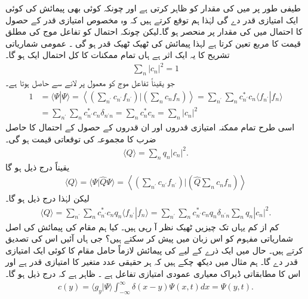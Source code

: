 طیفی طور پر  میں  کی مقدار کو  ظاہر کرتی ہے اور چونکہ کوئی بھی پیمائش  کی کوئی ایک امتیازی قدر دے گی لہٰذا ہم توقع کرتے ہیں کہ وہ مخصوص امتیازی قدر  کے حصول کا احتمال  میں  کی مقدار پر منحصر ہو گا۔لیکن چونکہ احتمال کو تفاعل موج کی مطلق قیمت کا مربع تعین کرتا ہے لہذا پیمائش کی ٹھیک ٹھیک قدر  ہو گی ۔ عمومی شماریاتی تشریح کا یہ ایک اثر ہے ہاں تمام ممکنات کا کل احتمال ایک ہو گا۔
\begin{align}
\sum_{n} |c_{n}|^{2} = 1
\end{align}
جو یقیناً تفاعل موج کو معمول پر لانے سے حاصل ہوتا ہے۔
\begin{align}
1 &= \langle \Psi | \Psi \rangle = \left\langle \left( \sum_{n^{'}}c_{n^{'}}f_{n^{'}}\right) \bigg| \left( \sum_{n} c_{n}f_{n} \right) \right\rangle = \sum_{n^{'}}\sum_{n} c_{n^{'}}^{*}c_{n}\langle f_{n^{'}} | f_{n} \rangle \nonumber \\
&= \sum_{n^{'}}\sum_{n} c_{n^{'}}^{*}c_{n} \delta_{n^{'}n} = \sum_{n}c_{n}^{*}c_{n} = \sum_{n}|c_{n}|^{2}
\end{align}
اسی طرح تمام ممکنہ امتیازی قدروں اور ان قدروں کے حصول کے احتمال کا حاصل ضرب کا مجموعہ کی توقعاتی قیمت ہو گی۔
\begin{align}
\langle Q \rangle = \sum_{n}q_{n}|c_{n}|^{2}.
\end{align}
یقیناً درج ذیل ہو گا 
\begin{align}
\langle Q \rangle = \langle \Psi | \hat{Q} \Psi \rangle =  \left\langle \left( \sum_{n^{'}}c_{n^{'}}f_{n^{'}}\right) \bigg| \left( \hat{Q} \sum_{n} c_{n}f_{n} \right) \right\rangle
\end{align}
لیکن  لہٰذا درج ذیل ہو گا۔
\begin{align}
\langle Q \rangle = \sum_{n^{'}}\sum_{n} c_{n^{'}}^{*}c_{n} q_{n} \langle f_{n^{'}} | f_{n} \rangle = \sum_{n^{'}}\sum_{n} c_{n^{'}}^{*}c_{n} q_{n} \delta_{n^{'}n} \sum_{n}q_{n}|c_{n}|^{2}.
\end{align}
کم از کم یہاں تک چیزیں ٹھیک نظر آ رہی ہیں۔
کیا ہم مقام کی پیمائش کی اصل شماریاتی مفہوم کو اس زبان میں پیش کر سکتے ہیں؟ جی ہاں آئیں اس کی تصدیق کرتے ہیں۔ حال  میں ایک ذرے کے لیے  کی پیمائش لازماً حامل مقام کا کوئی ایک امتیازی قدر دے گا۔ ہم مثال  میں دیکھ چکے ہیں کہ ہر حقیقی عدد  متغیر  کا امتیازی قدر ہے اور اس کا مطابقاتی ڈیراک معیاری عمودی امتیازی تفاعل  ہے ۔ ظاہر ہے کہ درج ذیل ہو گا۔
\begin{align}
c(y) = \langle g_{y} | \Psi \rangle  \int_{-\infty}^{\infty} \delta(x-y) \Psi(x,t)dx = \Psi(y,t).
\end{align}

